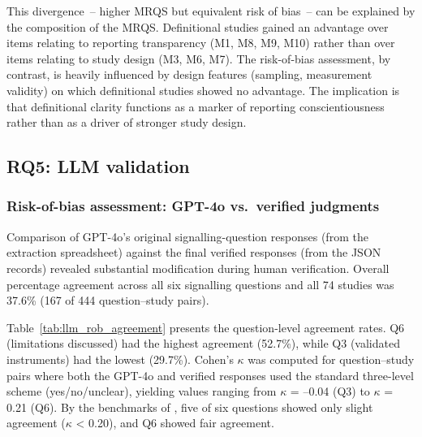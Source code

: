 \documentclass[etq]{acnsart}
\begin{document}
	This divergence~-- higher MRQS but equivalent risk of bias~-- can be explained by the composition of the MRQS. Definitional studies gained an advantage over items relating to reporting transparency (M1, M8, M9, M10) rather than over items relating to study design (M3, M6, M7). The risk-of-bias assessment, by contrast, is heavily influenced by design features (sampling, measurement validity) on which definitional studies showed no advantage. The implication is that definitional clarity functions as a marker of reporting conscientiousness rather than as a driver of stronger study design.
	
	\subsection{RQ5: LLM validation}
	\label{sec:results_rq5}
	
	\subsubsection{Risk-of-bias assessment: GPT-4o vs.\ verified judgments}
	\label{sec:results_rq5_rob}
	
	Comparison of GPT-4o's original signalling-question responses (from the extraction spreadsheet) against the final verified responses (from the JSON records) revealed substantial modification during human verification. Overall percentage agreement across all six signalling questions and all 74 studies was 37.6\% (167 of 444 question--study pairs).
	
	Table~\ref{tab:llm_rob_agreement} presents the question-level agreement rates. Q6 (limitations discussed) had the highest agreement (52.7\%), while Q3 (validated instruments) had the lowest (29.7\%). Cohen's $\kappa$ was computed for question--study pairs where both the GPT-4o and verified responses used the standard three-level scheme (yes/no/unclear), yielding values ranging from $\kappa$ = --0.04 (Q3) to $\kappa$ = 0.21 (Q6). By the benchmarks of \citet{LandisKoch1977}, five of six questions showed only slight agreement ($\kappa$ < 0.20), and Q6 showed fair agreement.
	
\end{document}
